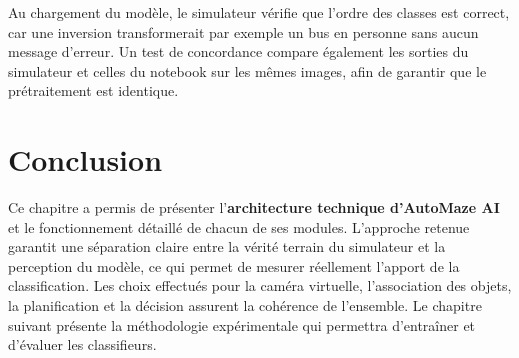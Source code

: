 Au chargement du modèle, le simulateur vérifie que l'ordre des classes est correct, car une inversion transformerait par exemple un bus en personne sans aucun message d'erreur. Un test de concordance compare également les sorties du simulateur et celles du notebook sur les mêmes images, afin de garantir que le prétraitement est identique.

\section{Conclusion}

Ce chapitre a permis de présenter l'\textbf{architecture technique d'AutoMaze AI} et le fonctionnement détaillé de chacun de ses modules. L'approche retenue garantit une séparation claire entre la vérité terrain du simulateur et la perception du modèle, ce qui permet de mesurer réellement l'apport de la classification. Les choix effectués pour la caméra virtuelle, l'association des objets, la planification et la décision assurent la cohérence de l'ensemble. Le chapitre suivant présente la méthodologie expérimentale qui permettra d'entraîner et d'évaluer les classifieurs.
